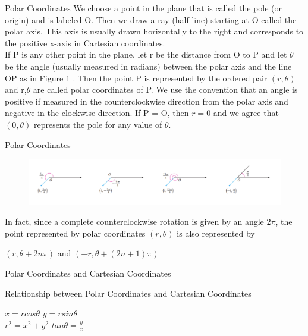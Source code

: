 \begin{frame}{Polar Coordinates}
    We choose a point in the plane that is called the pole (or origin) and is
    labeled O. Then we draw a ray (half-line) starting at O called the polar
    axis. This axis is usually drawn horizontally to the right and corresponds
    to the positive x-axis in Cartesian coordinates.\\
    If P is any other point in the plane, let r be the distance from O to P and
    let $\theta$ be the angle (usually measured in radians) between the polar axis and the line OP as in Figure 1 . Then the point P is represented by the
    ordered pair $(r,\theta)$ and r,$\theta$ are called polar coordinates of P. We use the convention that an angle is positive if measured in the counterclockwise direction from the polar axis and negative in the clockwise direction. If P = O, then $r = 0$ and we agree that $(0,\theta)$ represents the pole for any value of $\theta$.
\end{frame}
\begin{frame}{Polar Coordinates}
    \begin{figure}[htb]
        \centering
        \includegraphics[width=0.95\linewidth]{res/polar.png}
    \end{figure}
    In fact, since a complete counterclockwise rotation is given by an angle
    $2\pi$, the point represented by polar coordinates $(r,\theta)$ is also represented by\\
    \begin{center}
        $(r,\theta+2n\pi)$ and $(-r,\theta+(2n+1)\pi)$
    \end{center}
\end{frame}

\begin{frame}{Polar Coordinates and Cartesian Coordinates}
    \begin{block}{Relationship between Polar Coordinates and Cartesian Coordinates}
        \begin{center}
            $x=r cos\theta$  $y=r sin \theta$\\
            $r^2=x^2+y^2$  $tan\theta = \frac{y}{x}$
        \end{center}
    \end{block}
\end{frame}

